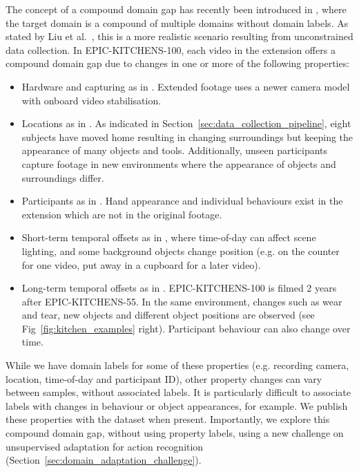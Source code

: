 \documentclass[twocolumn]{svjour3}          \smartqed
\newcommand {\oldDataset} {EPIC-KITCHENS-55{}}
\newcommand {\newDataset} {EPIC-KITCHENS-100}
\begin{document}
The concept of a compound domain gap has recently been introduced in \cite{Liu2020}, where the target domain is a compound of multiple domains without domain labels. As stated by Liu et al.~\cite{Liu2020}, this is a more realistic scenario resulting from unconstrained data collection. 
In \newDataset{}, each video in the extension offers a compound domain gap due to changes in one or more of the following properties: \begin{itemize}[leftmargin=*,itemsep=-2ex,partopsep=1ex,parsep=2ex]
    \item Hardware and capturing as in \cite{Saenko2010a,Gong2012}.  Extended footage uses a newer camera model with onboard video stabilisation.
    \item Locations as in \cite{Oberdiek2020}.  As indicated in Section~\ref{sec:data_collection_pipeline},  eight subjects have moved home resulting in changing surroundings but keeping the appearance of many objects and tools. Additionally, unseen participants capture footage in new environments where the appearance of objects and surroundings differ.
    \item Participants as in \cite{Stein}.  Hand appearance and individual behaviours exist in the extension which are not in the original footage.
    \item Short-term temporal offsets as in \cite{Wulfmeier2018}, where time-of-day can affect scene lighting, and some background objects change position (e.g. on the counter for one video, put away in a cupboard for a later video).
    \item Long-term temporal offsets as in \cite{Carlevaris-Bianco2016,Maddern2017}.  \newDataset{} is filmed 2 years after \oldDataset{}.  In the same environment, changes such as wear and tear, new objects and different object positions are observed (see Fig~\ref{fig:kitchen_examples} right).  Participant behaviour can also change over time.
\end{itemize}

While we have domain labels for some of these properties (e.g. recording camera, location, time-of-day and participant ID), other property changes can vary between samples, without associated labels.
It is particularly difficult to associate labels with changes in behaviour or object appearances, for example.
We publish these properties with the dataset when present.
Importantly, we explore this compound domain gap, without using property labels, using a new challenge on unsupervised adaptation for action recognition (Section~\ref{sec:domain_adaptation_challenge}).
\end{document}
